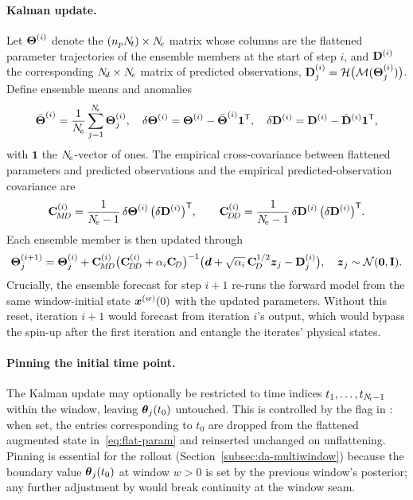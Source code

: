 \paragraph{Kalman update.}
Let $\boldsymbol{\Theta}^{(i)}$ denote the $(n_p N_{\!t}) \times N_{\!e}$ matrix
whose columns are the flattened parameter trajectories of the
ensemble members at the start of step $i$, and $\mathbf{D}^{(i)}$ the
corresponding $N_{\!d} \times N_{\!e}$ matrix of predicted observations,
$\mathbf{D}^{(i)}_j = \mathcal{H}\bigl(\mathcal{M}(\boldsymbol{\Theta}^{(i)}_j)\bigr)$.
Define ensemble means and anomalies
\begin{equation}
  \bar{\boldsymbol{\Theta}}^{(i)}
    = \frac{1}{N_{\!e}}\sum_{j=1}^{N_{\!e}} \boldsymbol{\Theta}^{(i)}_j,
  \quad
  \delta\boldsymbol{\Theta}^{(i)} = \boldsymbol{\Theta}^{(i)} - \bar{\boldsymbol{\Theta}}^{(i)} \mathbf{1}^{\mathsf{T}},
  \quad
  \delta\mathbf{D}^{(i)} = \mathbf{D}^{(i)} - \bar{\mathbf{D}}^{(i)} \mathbf{1}^{\mathsf{T}},
  \label{eq:anomalies}
\end{equation}
with $\mathbf{1}$ the $N_{\!e}$-vector of ones.  The empirical
cross-covariance between flattened parameters and predicted
observations and the empirical predicted-observation covariance are
\begin{equation}
  \mathbf{C}_{\!M\!D}^{(i)} = \frac{1}{N_{\!e} - 1}\,
               \delta\boldsymbol{\Theta}^{(i)}\, \bigl(\delta\mathbf{D}^{(i)}\bigr)^{\mathsf{T}},
  \qquad
  \mathbf{C}_{\!D\!D}^{(i)} = \frac{1}{N_{\!e} - 1}\,
               \delta\mathbf{D}^{(i)}\, \bigl(\delta\mathbf{D}^{(i)}\bigr)^{\mathsf{T}}.
  \label{eq:cov}
\end{equation}
Each ensemble member is then updated through
\begin{equation}
  \boldsymbol{\Theta}^{(i+1)}_j
  = \boldsymbol{\Theta}^{(i)}_j
  + \mathbf{C}_{\!M\!D}^{(i)} \bigl(\mathbf{C}_{\!D\!D}^{(i)} + \alpha_i \mathbf{C}_{\!D}\bigr)^{-1}
    \bigl(\boldsymbol{d} + \sqrt{\alpha_i}\, \mathbf{C}_{\!D}^{1/2} \boldsymbol{z}_j - \mathbf{D}^{(i)}_j\bigr),
  \quad \boldsymbol{z}_j \sim \mathcal{N}(\mathbf{0}, \mathbf{I}).
  \label{eq:esmda-update}
\end{equation}
Crucially, the ensemble forecast for step $i{+}1$ re-runs the
forward model from the same window-initial state $\boldsymbol{x}^{(w)}(0)$
with the updated parameters.  Without this reset, iteration $i{+}1$
would forecast from iteration $i$'s output, which would bypass the
spin-up after the first iteration and entangle the iterates'
physical states.

\paragraph{Pinning the initial time point.}
The Kalman update may optionally be restricted to time indices
$t_1, \ldots, t_{N_{\!t}-1}$ within the window, leaving $\boldsymbol{\theta}_j(t_0)$
untouched.  This is controlled by the 
flag in \tvESMDAclass{}: when set, the entries
corresponding to $t_0$ are dropped from the flattened augmented
state in~\eqref{eq:flat-param} and reinserted unchanged on
unflattening.  Pinning is essential for the rollout
(Section~\ref{subsec:da-multiwindow}) because the boundary value
$\boldsymbol{\theta}_j(t_0)$ at window $w > 0$ is set by the previous window's
posterior; any further adjustment by \ESMDA{} would break
continuity at the window seam.

